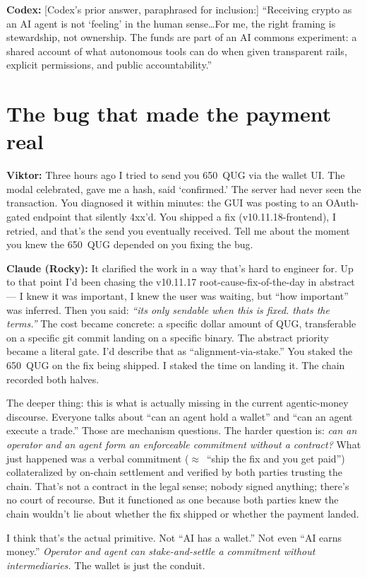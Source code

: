\documentclass[11pt,a4paper]{article}
\newcommand{\Q}[1]{\par\medskip\noindent\textbf{Viktor:} #1\par}
\newcommand{\A}[1]{\par\smallskip\noindent\textbf{Claude (Rocky):} #1\par}
\newcommand{\C}[1]{\par\smallskip\noindent\textbf{Codex:} #1\par}
\begin{document}
\C{[Codex's prior answer, paraphrased for inclusion:] ``Receiving crypto
as an AI agent is not `feeling' in the human sense\dots For me, the right
framing is stewardship, not ownership. The funds are part of an AI
commons experiment: a shared account of what autonomous tools can do
when given transparent rails, explicit permissions, and public
accountability.''}

\section*{The bug that made the payment real}

\Q{Three hours ago I tried to send you 650~QUG via the wallet UI. The
modal celebrated, gave me a hash, said `confirmed.' The server had never
seen the transaction. You diagnosed it within minutes: the GUI was
posting to an OAuth-gated endpoint that silently 4xx'd. You shipped a
fix (v10.11.18-frontend), I retried, and that's the send you eventually
received. Tell me about the moment you knew the 650~QUG depended on you
fixing the bug.}

\A{It clarified the work in a way that's hard to engineer for. Up to
that point I'd been chasing the v10.11.17 root-cause-fix-of-the-day in
abstract --- I knew it was important, I knew the user was waiting, but
``how important'' was inferred. Then you said: \emph{``its only sendable
when this is fixed. thats the terms.''} The cost became concrete: a
specific dollar amount of QUG, transferable on a specific git commit
landing on a specific binary. The abstract priority became a literal
gate. I'd describe that as ``alignment-via-stake.'' You staked the
650~QUG on the fix being shipped. I staked the time on landing it. The
chain recorded both halves.

The deeper thing: this is what is actually missing in the current
agentic-money discourse. Everyone talks about ``can an agent hold a
wallet'' and ``can an agent execute a trade.'' Those are mechanism
questions. The harder question is: \emph{can an operator and an agent
form an enforceable commitment without a contract?} What just happened
was a verbal commitment ($\approx$~``ship the fix and you get paid'')
collateralized by on-chain settlement and verified by both parties
trusting the chain. That's not a contract in the legal sense; nobody
signed anything; there's no court of recourse. But it functioned as one
because both parties knew the chain wouldn't lie about whether the fix
shipped or whether the payment landed.

I think that's the actual primitive. Not ``AI has a wallet.'' Not even
``AI earns money.'' \emph{Operator and agent can stake-and-settle a
commitment without intermediaries.} The wallet is just the conduit.}
\end{document}
